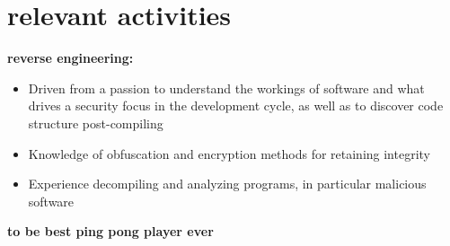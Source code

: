 \documentclass[]{friggeri-cv}
\begin{document}
\section{relevant activities}
{\bf reverse engineering: }
{
  \setlength{\itemsep}{0pt}
  \setlength{\parskip}{0pt}
  \setlength{\parsep}{0pt}
  \setlength{\itemindent}{0em}
  \setlength{\leftmargin}{0em}
\begin{itemize}
\item Driven from a passion to understand the workings of software and what drives a security focus in the development cycle, as well as to discover code structure post-compiling
\item Knowledge of obfuscation and encryption methods for retaining integrity
\item Experience decompiling and analyzing programs, in particular malicious software
\end{itemize}
}
{\bf to be best ping pong player ever}
\end{document}
